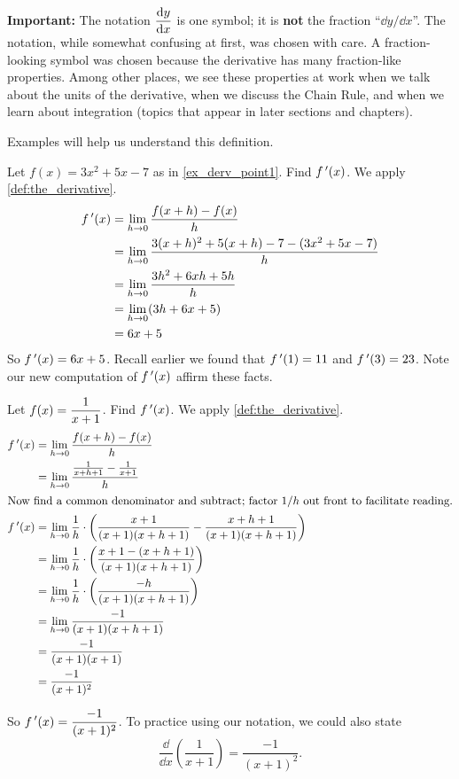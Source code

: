 \noindent
\textbf{Important:} The notation $\displaystyle \frac{\operatorname{d}\! y}{\operatorname{d}\! x}$ is one symbol; it is \textbf{not} the fraction ``$\dd y/\dd x$''. The notation, while somewhat confusing at first, was chosen with care. A fraction-looking symbol was chosen because the derivative has many fraction-like properties. Among other places, we see these properties at work when we talk about the units of the derivative, when we discuss the Chain Rule, and when we learn about integration (topics that appear in later sections and chapters).\bigskip

Examples will help us understand this definition.

\begin{example}\label{ex_deriv1}%
Let $f(x) = 3x^2+5x-7$ as in \autoref{ex_derv_point1}. Find $f\,'(x)$.
\solution
We apply \autoref{def:the_derivative}.
\begin{align*}
	f\,'(x)
	&= \lim_{h\to 0} \frac{f(x+h)-f(x)}{h} \\
	&=	\lim_{h\to 0} \frac{3(x+h)^2+5(x+h)-7-(3x^2+5x-7)}{h}\\
	&=	\lim_{h\to 0} \frac{3h^2 +6xh+5h}{h}\\
	&= \lim_{h\to 0}(3h+6x+5)\\
	&= 6x+5
\end{align*}
So $f\,'(x) = 6x+5$. Recall earlier we found that $f\,'(1) = 11$ and $f\,'(3) = 23$. Note our new computation of $f\,'(x)$ affirm these facts.
\end{example}

\begin{example}\label{ex_deriv2}%
Let $\displaystyle f(x) = \frac{1}{x+1}$. Find $f\,'(x)$.
\solution
We apply \autoref{def:the_derivative}.
\begin{align*}
	f\,'(x)
	&= \lim_{h\to 0} \frac{f(x+h)-f(x)}{h}\\
	&=	\lim_{h\to 0} \frac{\frac{1}{x+h+1}-\frac{1}{x+1}}{h}\\
	\intertext{Now find a common denominator and subtract; factor \(1/h\) out front to facilitate reading.}
	f\,'(x)
	&= \lim_{h\to 0} \frac{1}{h}\cdot\left(\frac{x+1}{(x+1)(x+h+1)} - \frac{x+h+1}{(x+1)(x+h+1)}\right)\\
	&=	\lim_{h\to 0} \frac 1h\cdot\left(\frac{x+1-(x+h+1)}{(x+1)(x+h+1)}\right)\\
	&=	\lim_{h\to 0} \frac1h\cdot\left(\frac{-h}{(x+1)(x+h+1)}\right)\\
	&=	\lim_{h\to 0} \frac{-1}{(x+1)(x+h+1)} \\
	&= \frac{-1}{(x+1)(x+1)}\\
	&= \frac{-1}{(x+1)^2}
\end{align*}
	
So $\displaystyle f\,'(x) = \frac{-1}{(x+1)^2}$. To practice using our notation, we could also state
\[\frac{\dd}{\dd x}\left(\frac{1}{x+1}\right) = \frac{-1}{(x+1)^2}.\]
\end{example}

